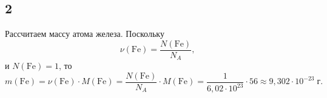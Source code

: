 \subsection{2}
Рассчитаем массу атома железа. Поскольку
\[
\nu(\mathrm{Fe})=\frac{N(\mathrm{Fe})}{N_A},
\]
и $N(\mathrm{Fe})=1$, то
\[
m(\mathrm{Fe})=\nu(\mathrm{Fe})\cdot M(\mathrm{Fe})=\frac{N(\mathrm{Fe})}{N_A}\cdot M(\mathrm{Fe})=\frac{1}{6{,}02\cdot10^{23}}\cdot 56\approx9{,}302\cdot10^{-23}\;\text{г}.
\]